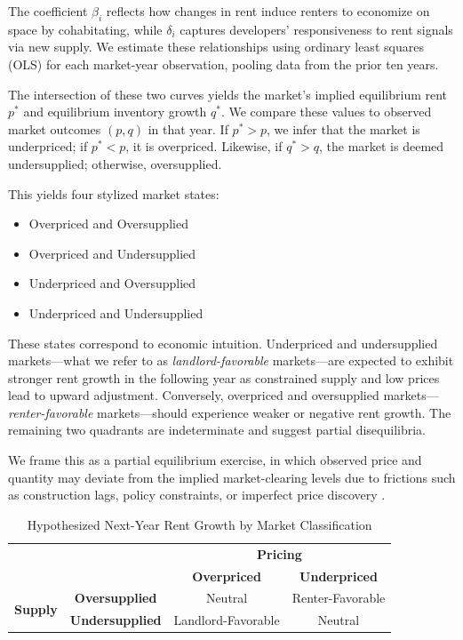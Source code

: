 \documentclass[sn-mathphys-num]{sn-jnl}%
\begin{document}
The coefficient \( \beta_i \) reflects how changes in rent induce renters to economize on space by cohabitating, while \( \delta_i \) captures developers' responsiveness to rent signals via new supply. We estimate these relationships using ordinary least squares (OLS) for each market-year observation, pooling data from the prior ten years.

The intersection of these two curves yields the market's implied equilibrium rent \( p^* \) and equilibrium inventory growth \( q^* \). We compare these values to observed market outcomes \( (p, q) \) in that year. If \( p^* > p \), we infer that the market is underpriced; if \( p^* < p \), it is overpriced. Likewise, if \( q^* > q \), the market is deemed undersupplied; otherwise, oversupplied.

This yields four stylized market states:
\begin{itemize}
\item Overpriced and Oversupplied
\item Overpriced and Undersupplied
\item Underpriced and Oversupplied
\item Underpriced and Undersupplied
\end{itemize}

These states correspond to economic intuition. Underpriced and undersupplied markets---what we refer to as \textit{landlord-favorable} markets---are expected to exhibit stronger rent growth in the following year as constrained supply and low prices lead to upward adjustment. Conversely, overpriced and oversupplied markets---\textit{renter-favorable} markets---should experience weaker or negative rent growth. The remaining two quadrants are indeterminate and suggest partial disequilibria.

We frame this as a partial equilibrium exercise, in which observed price and quantity may deviate from the implied market-clearing levels due to frictions such as construction lags, policy constraints, or imperfect price discovery \citep{wheaton1991realestate, glaeser2019rethinking}.

\begin{table}[h!]
	\centering
	\caption*{Hypothesized Next-Year Rent Growth by Market Classification}
	\begin{tabular}{cc|c|c|}
		\multicolumn{2}{c}{} & \multicolumn{2}{c}{\textbf{Pricing}} \\
		\multicolumn{2}{c}{} & \textbf{Overpriced} & \textbf{Underpriced} \\
		\cmidrule{3-4}
		\multirow{2}{*}{\textbf{Supply}} & \textbf{Oversupplied} & Neutral & Renter-Favorable \\
		\cmidrule{2-4}
		& \textbf{Undersupplied} & Landlord-Favorable & Neutral \\
		\bottomrule
	\end{tabular}
\end{table}
\end{document}
